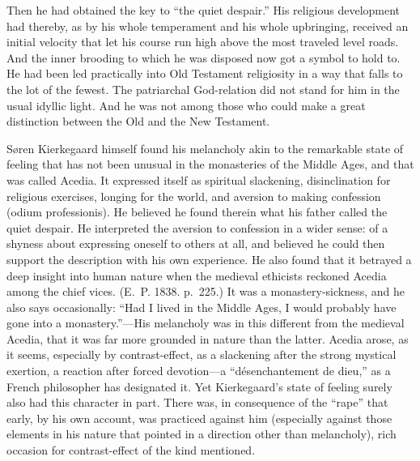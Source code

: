 \documentclass[12pt,a4paper]{book}
\newcommand{\opage}[1]{\marginnote{\footnotesize\textit{[#1]}}}
\begin{document}
Then he had obtained the key to ``the quiet despair.'' His religious
development had thereby, as by his whole temperament and his whole
upbringing, received an initial velocity that let his course run high
above the most traveled level roads. And the inner brooding to which he
was disposed now got a symbol to hold to. He had been led practically
into Old Testament religiosity in a way that falls to the lot of the
fewest. The patriarchal God-relation did not stand for him in the usual
idyllic light. And he was not among those who
\opage{37}could make a great distinction between the Old and the New
Testament.

Søren Kierkegaard himself found his melancholy akin to the remarkable
state of feeling that has not been unusual in the monasteries of the
Middle Ages, and that was called Acedia. It expressed itself as spiritual
slackening, disinclination for religious exercises, longing for the
world, and aversion to making confession (odium professionis). He
believed he found therein what his father called the quiet despair. He
interpreted the aversion to confession in a wider sense: of a shyness
about expressing oneself to others at all, and believed he could then
support the description with his own experience. He also found that it
betrayed a deep insight into human nature when the medieval ethicists
reckoned Acedia among the chief vices. (E.~P. 1838. p.~225.) It was a
monastery-sickness, and he also says occasionally: ``Had I lived in the
Middle Ages, I would probably have gone into a monastery.''---His
melancholy was in this different from the medieval Acedia, that it was
far more grounded in nature than the latter. Acedia arose, as it seems,
especially by contrast-effect, as a slackening after the strong mystical
exertion, a reaction after forced devotion---a ``désenchantement de
dieu,'' as a French philosopher has designated it. Yet Kierkegaard's
state of feeling surely also had this character in part. There was, in
consequence of the ``rape'' that early, by his own account, was practiced
against him (especially against those elements in his nature that pointed
in a direction other than melancholy), rich occasion for contrast-effect
of the kind mentioned.
\end{document}
